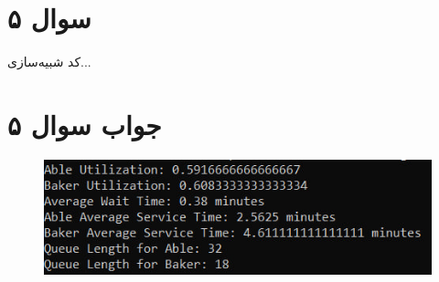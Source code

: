 \section*{سوال ۵}

کد شبیه‌سازی...
\section*{جواب سوال ۵}

\begin{figure}[h]
	\centering
	\includegraphics{pic1.jpg}
	\label{fig:label4}
\end{figure}